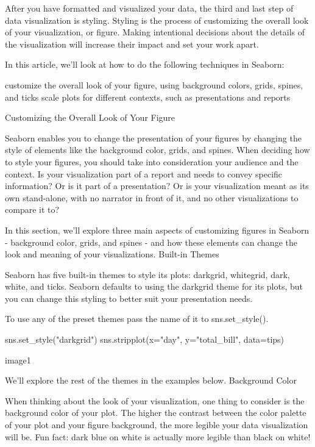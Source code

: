 \documentclass{journal}
\begin{document}
After you have formatted and visualized your data, the third and last step of data visualization is styling. Styling is the process of customizing the overall look of your visualization, or figure. Making intentional decisions about the details of the visualization will increase their impact and set your work apart.

In this article, we’ll look at how to do the following techniques in Seaborn:

    customize the overall look of your figure, using background colors, grids, spines, and ticks
    scale plots for different contexts, such as presentations and reports

Customizing the Overall Look of Your Figure

Seaborn enables you to change the presentation of your figures by changing the style of elements like the background color, grids, and spines. When deciding how to style your figures, you should take into consideration your audience and the context. Is your visualization part of a report and needs to convey specific information? Or is it part of a presentation? Or is your visualization meant as its own stand-alone, with no narrator in front of it, and no other visualizations to compare it to?

In this section, we’ll explore three main aspects of customizing figures in Seaborn - background color, grids, and spines - and how these elements can change the look and meaning of your visualizations.
Built-in Themes

Seaborn has five built-in themes to style its plots: darkgrid, whitegrid, dark, white, and ticks. Seaborn defaults to using the darkgrid theme for its plots, but you can change this styling to better suit your presentation needs.

To use any of the preset themes pass the name of it to sns.set_style().

sns.set_style("darkgrid")
sns.stripplot(x="day", y="total_bill", data=tips)

image1

We’ll explore the rest of the themes in the examples below.
Background Color

When thinking about the look of your visualization, one thing to consider is the background color of your plot. The higher the contrast between the color palette of your plot and your figure background, the more legible your data visualization will be. Fun fact: dark blue on white is actually more legible than black on white!
\end{document}
